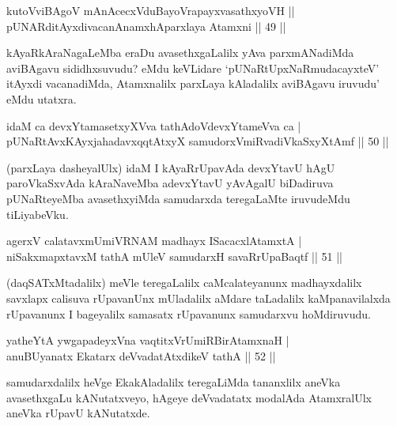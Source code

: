\begin{shl}
kutoV\s viBAgoV mAnAcecxVduBayoVrapayxvasathxyoVH ||  \\
pUNARditAyxdivacanAnamxhAparxlaya Atamxni \hfill||  49 ||  
\end{shl}

\begin{artha}
kAyaRkAraNagaLeMba eraDu avasethxgaLalilx yAva parxmANadiMda aviBAgavu sididhxsuvudu? eMdu keVLidare `pUNaRtUpxNaRmudacayxteV' itAyxdi vacanadiMda, Atamxnalilx parxLaya kAladalilx aviBAgavu iruvudu' eMdu utatxra.
\end{artha}

\begin{shl}
idaM ca devxYtamasetxyXVva tathA\s doV\s devxYtameVva ca  | \\
pUNaRtAvxKAyxja{\null}hadavxqqtAtxyX samudorxVmiRvadiVkaSxyXtAmf \hfill||  50 ||  
\end{shl}

\begin{artha}
(parxLaya dasheyalUlx) idaM I kAyaRrUpavAda devxYtavU hAgU paroVkaSxvAda kAraNaveMba adevxYtavU yAvAgalU biDadiruva pUNaRteyeMba avasethxyiMda samudarxda teregaLaMte iruvudeMdu tiLiyabeVku.
\end{artha}

\begin{shl}
agerxV calatavxmUmiVRNAM madhayx ISacacxlAtamxtA  | \\
niSakxmapxtavxM tathA mUleV samudarxH savaRrUpaBaqtf \hfill||  51 ||  
\end{shl}

\begin{artha}
(daqSATxMtadalilx) meVle teregaLalilx caMcalateyanunx madhayxdalilx savxlapx calisuva rUpavanUnx mUladalilx aMdare taLadalilx kaMpanavilalxda rUpavanunx I bageyalilx samasatx rUpavanunx samudarxvu hoMdiruvudu.
\end{artha}

\begin{shl}
yatheYtA ywgapadeyxVna vaqtitxVrUmiRBirAtamxnaH  | \\
anuBUyanatx Ekatarx deVvadatAtxdikeV tathA \hfill||  52 ||  
\end{shl}

\begin{artha}
samudarxdalilx heVge EkakAladalilx teregaLiMda tananxlilx aneVka avasethxgaLu kANutatxveyo, hAgeye deVvadatatx modalAda AtamxralUlx aneVka rUpavU kANutatxde.
\end{artha}


